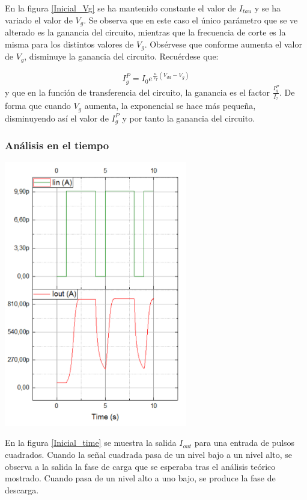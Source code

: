 	En la figura \ref{Inicial_Vg} se ha mantenido constante el valor de $I_{tau}$ y se ha variado el valor de $V_g$. Se observa que en este caso el único parámetro que se ve alterado es la ganancia del circuito, mientras que la frecuencia de corte es la misma para los distintos valores de $V_g$. Obsérvese que conforme aumenta el valor de $V_g$, disminuye la ganancia del circuito. Recuérdese que:
	
	$$I_g^P=I_0e^{\frac{\kappa}{V_T}(V_{dd}-V_g)}$$ y que en la función de transferencia del circuito, la ganancia es el factor $\frac{I_g^P}{I_{\tau}}$. De forma que cuando $V_g$ aumenta, la exponencial se hace más pequeña, disminuyendo así el valor de $I_g^P$ y por tanto la ganancia del circuito.
	
	\subsubsection{Análisis en el tiempo}
	
		
	\begin{center}
		\includegraphics[width=8cm]{Imagenes/Sinaptico/Inicial_time}
    		\label{Inicial_time}
	\end{center}	
	
	En la figura \ref{Inicial_time} se muestra la salida $I_{out}$ para una entrada de pulsos cuadrados. Cuando la señal cuadrada pasa de un nivel bajo a un nivel alto, se observa a la salida la fase de carga que se esperaba tras el análisis teórico mostrado. Cuando pasa de un nivel alto a uno bajo, se produce la fase de descarga.
	
